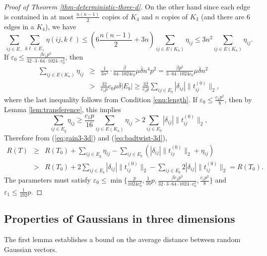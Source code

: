 \begin{proof}[Proof of Theorem \ref{thm-deterministic-three-d}]
On the other hand since each edge is contained in at most $\frac{n(n-1)}{2}$
copies of $K_{4}$ and $n$ copies of $K_{3}$ (and there are 6 edges
in a $K_{4}$), we have 
\[
\sum_{ij\in E_{-}}\sum_{k\ell\in E_{+}}\eta(ij,k\ell)\le\left(6\frac{n(n-1)}{2}+3n\right)\sum_{ij\in E(K_{n})}\eta_{ij}\le3n^{2}\sum_{ij\in E(K_{n})}\eta_{ij}.
\]
If $\varepsilon_{0}\le\frac{\beta c_{1}p^{3}}{32 \cdot 3 \cdot 64 \cdot 1024 \cdot c_{0}^2}$, then
\begin{eqnarray*}
	\sum_{ij\in E(K_{n})}\eta_{ij} 
	& \ge & \frac{1}{3n^{2}}\cdot\frac{\beta}{64\cdot1024c_0}\mu\overline{\delta}n^{4}p^{2}
	=\frac{\beta p^{2}}{3\cdot64\cdot1024c_0}\mu\overline{\delta}n^{2} \\
	& > & \frac{32}{c_{1}p}c_{0}\mu\overline{\delta}|E_{b}|
	\ge\frac{32}{c_{1}p}\sum_{ij\in E_{b}}|\delta_{ij}|\|t_{ij}^{(0)}\|_2,
\end{eqnarray*}
where the last inequality follows from Condition \ref{enu:length}.
If $\varepsilon_0 \le \frac{c_1p^2}{8}$, then by Lemma \ref{lem:transference}, this implies 
\[
	\sum_{ij\in E_{g}}\eta_{ij}
	\ge\frac{c_{1}p}{16}\sum_{ij\in E(K_{n})}\eta_{ij}
	>2\sum_{ij\in E_{b}}|\delta_{ij}|\|t_{ij}^{(0)}\|_2,
\]
Therefore from (\ref{eq:gain3-3d}) and (\ref{eq:badtwist-3d}), 
\begin{eqnarray*}
	R(T) & \ge & R(T_{0})+\sum_{ij\in E_{g}}\eta_{ij}-\sum_{ij\in E_{b}}(|\delta_{ij}|\|t_{ij}^{(0)}\|_2+\eta_{ij})\\
	& > & R(T_{0})+2\sum_{ij\in E_{b}}|\delta_{ij}|\|t_{ij}^{(0)}\|_2-\sum_{ij\in E_{b}}2|\delta_{ij}|\|t_{ij}^{(0)}\|_2=R(T_{0}).
\end{eqnarray*}
The parameters must satisfy $\varepsilon_0 \le \min\{\frac{p}{1024c_0^2}, \frac{1}{16}p, \frac{\beta c_1 p^3}{32 \cdot 3 \cdot 64 \cdot 1024 \cdot c_0^2}, \frac{c_1p^2}{8}\}$ and $\varepsilon_1 \le \frac{1}{192}p$.
\end{proof}



\subsection{Properties of Gaussians in three dimensions} \label{sec-gaussians-well-distributed-3d}

The first lemma establishes a bound on the average distance between random
Gaussian vectors.

